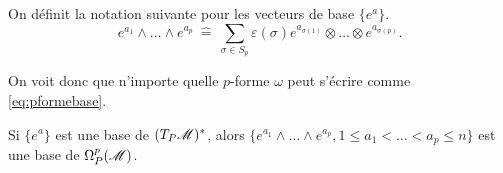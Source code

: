 \documentclass[a4paper,11pt]{report}
\begin{document}
            \begin{defn}
                On définit la notation suivante pour les vecteurs de base $\{e^a\}$.
                \begin{equation}
                    e^{a_1}\wedge \dots\wedge e^{a_{p}} ~\hat{=}~ \sum_{\sigma\in S_p}\varepsilon(\sigma)e^{a_{\sigma(1)}}\otimes\dots\otimes e^{a_{\sigma(p)}}.
                \end{equation}
            \end{defn}
            
            On voit donc que n'importe quelle $p$-forme $\omega$ peut s'écrire comme \ref{eq:pformebase}.
            \begin{prop}\begin{leftbar}
                Si $\{e^a\}$ est une base de $(T_P\mathscr{M})^*$, alors $\{e^{a_1}\wedge\dots \wedge e^{a_p},1\leq a_1<\dots<a_p\leq n\}$ est une base de $\Omega_P^p(\mathscr{M})$.
            \end{leftbar}\end{prop}
            
\end{document}
